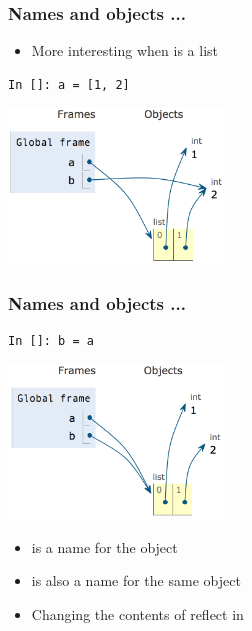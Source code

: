 \documentclass[14pt,compress]{beamer}
\begin{document}
\begin{frame}[fragile]
  \frametitle{Names and objects ...}
  \begin{itemize}
  \item More interesting when  is a list
  \end{itemize}
  \begin{minipage}{0.4\textwidth}
  \begin{lstlisting}
In []: a = [1, 2]
\end{lstlisting}
\end{minipage}
  \begin{minipage}{0.4\textwidth}
    \hspace*{0.2in}\includegraphics[width=2.25in]{data/a_list_b_2.png}
  \end{minipage}
\end{frame}

\begin{frame}[fragile]
  \frametitle{Names and objects ...}
  \begin{minipage}{0.4\textwidth}
  \begin{lstlisting}
In []: b = a
\end{lstlisting}
\end{minipage}
  \begin{minipage}{0.4\textwidth}
    \hspace*{0.2in}\includegraphics[width=2.25in]{data/a_b_list.png}
  \end{minipage}
  \pause
  \begin{itemize}
  \item {} is a name for the object \typ{[1, 2]}
  \item {} is also a name for the \alert{same object}
  \item Changing the contents of  reflect in 
  \end{itemize}
\end{frame}
\end{document}
